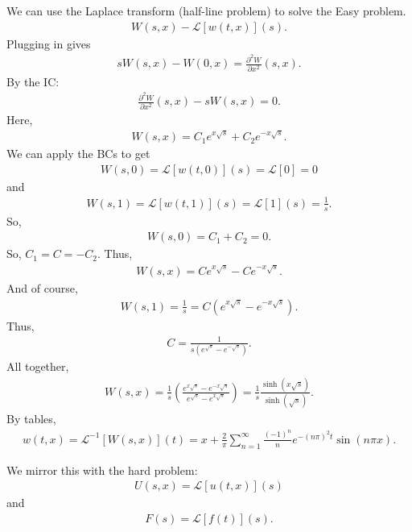 \documentclass{article}
\theoremstyle{definition}
\newcommand{\p}{\partial}
\newcommand{\lag}{\mathcal{L}}
\newcommand{\f}[2]{\frac{#1}{#2}}
\newcommand{\lp}{\left(}
\newcommand{\rp}{\right)}
\begin{document}
We can use the Laplace transform (half-line problem) to solve the Easy problem. 
\begin{align*}
W(s,x) - \lag[w(t,x)](s).
\end{align*}
Plugging in gives
\begin{align*}
sW(s,x) - W(0,x) = \f{\p^2 W}{\p x^2}(s,x).
\end{align*}
By the IC:
\begin{align*}
\f{\p^2 W}{\p x^2}(s,x) - sW(s,x) = 0.
\end{align*}
Here,
\begin{align*}
W(s,x) = C_1 e^{x\sqrt{s}} + C_2 e^{-x\sqrt{s}}.
\end{align*}
We can apply the BCs to get
\begin{align*}
W(s,0) = \lag[w(t,0)](s) = \lag[0] = 0
\end{align*}
and
\begin{align*}
W(s,1) = \lag[w(t,1)](s) = \lag[1](s) = \f{1}{s}.
\end{align*}
So,
\begin{align*}
W(s,0) = C_1 + C_2 = 0.
\end{align*}
So, $C_1 = C = -C_2$. Thus,
\begin{align*}
W(s,x) = C e^{x\sqrt{s}} - C e^{-x\sqrt{s}}.
\end{align*}
And of course,
\begin{align*}
W(s,1) = \f{1}{s} = C\lp e^{x\sqrt{s}} - e^{-x\sqrt{s}}\rp.
\end{align*}
Thus,
\begin{align*}
C = \f{1}{s\lp e^{\sqrt{s}} - e^{-\sqrt{s}}\rp}.
\end{align*}
All together,
\begin{align*}
W(s,x) = \f{1}{s}\lp \f{e^{x\sqrt{s}} - e^{-x\sqrt{s}}}{e^{\sqrt{s}} - e^{x\sqrt{s}}} \rp = \f{1}{s}\f{\sinh(x\sqrt{s})}{\sinh(\sqrt{s})}.
\end{align*}
By tables, 
\begin{align*}
w(t,x) = \lag^{-1}[W(s,x)](t) = x + \f{2}{\pi}\sum^\infty_{n=1}\f{(-1)^n}{n}e^{-(n\pi)^2t}\sin(n\pi x).
\end{align*}

We mirror this with the hard problem:
\begin{align*}
U(s,x) = \lag[u(t,x)](s)
\end{align*}
and
\begin{align*}
F(s) = \lag[f(t)](s).
\end{align*}
\end{document}
